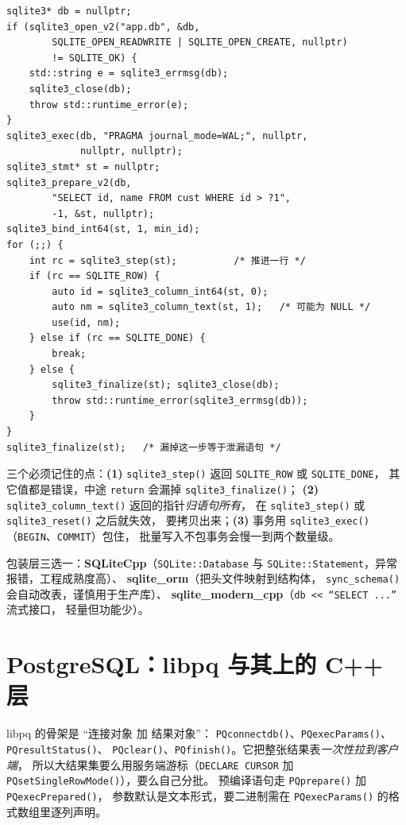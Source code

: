 \documentclass[12pt,a4paper,fontset=fandol]{ctexbook}
\newcommand{\Fn}[1]{\texttt{#1()}}
\newcommand{\Tp}[1]{\texttt{#1}}
\begin{document}
\begin{lstlisting}[caption={SQLite C API：prepare、bind、step、finalize}]
sqlite3* db = nullptr;
if (sqlite3_open_v2("app.db", &db,
        SQLITE_OPEN_READWRITE | SQLITE_OPEN_CREATE, nullptr)
        != SQLITE_OK) {
    std::string e = sqlite3_errmsg(db);
    sqlite3_close(db);
    throw std::runtime_error(e);
}
sqlite3_exec(db, "PRAGMA journal_mode=WAL;", nullptr,
             nullptr, nullptr);
sqlite3_stmt* st = nullptr;
sqlite3_prepare_v2(db,
        "SELECT id, name FROM cust WHERE id > ?1",
        -1, &st, nullptr);
sqlite3_bind_int64(st, 1, min_id);
for (;;) {
    int rc = sqlite3_step(st);          /* 推进一行 */
    if (rc == SQLITE_ROW) {
        auto id = sqlite3_column_int64(st, 0);
        auto nm = sqlite3_column_text(st, 1);   /* 可能为 NULL */
        use(id, nm);
    } else if (rc == SQLITE_DONE) {
        break;
    } else {
        sqlite3_finalize(st); sqlite3_close(db);
        throw std::runtime_error(sqlite3_errmsg(db));
    }
}
sqlite3_finalize(st);   /* 漏掉这一步等于泄漏语句 */
\end{lstlisting}

三个必须记住的点：\textbf{(1)} \Fn{sqlite3\_step} 返回
\Tp{SQLITE\_ROW} 或 \Tp{SQLITE\_DONE}，
其它值都是错误，中途 \Tp{return} 会漏掉 \Fn{sqlite3\_finalize}；
\textbf{(2)} \Fn{sqlite3\_column\_text} 返回的指针\emph{归语句所有}，
在 \Fn{sqlite3\_step} 或 \Fn{sqlite3\_reset} 之后就失效，
要拷贝出来；\textbf{(3)} 事务用
\Fn{sqlite3\_exec}（\texttt{BEGIN}、\texttt{COMMIT}）包住，
批量写入不包事务会慢一到两个数量级。

包装层三选一：\textbf{SQLiteCpp}（\Tp{SQLite::Database} 与
\Tp{SQLite::Statement}，异常报错，工程成熟度高）、
\textbf{sqlite\_orm}（把头文件映射到结构体，
\Fn{sync\_schema} 会自动改表，谨慎用于生产库）、
\textbf{sqlite\_modern\_cpp}（\texttt{db << ``SELECT ...''} 流式接口，
轻量但功能少）。

\section{PostgreSQL：libpq 与其上的 C++ 层}

libpq 的骨架是 ``连接对象 加 结果对象''：
\Fn{PQconnectdb}、\Fn{PQexec\allowbreak{}Params}、\Fn{PQresult\allowbreak{}Status}、
\Fn{PQclear}、\Fn{PQfinish}。它把整张结果表\emph{一次性拉到客户端}，
所以大结果集要么用服务端游标（\texttt{DECLARE CURSOR} 加
\Fn{PQset\allowbreak{}Single\allowbreak{}Row\allowbreak{}Mode}），要么自己分批。
预编译语句走 \Fn{PQprepare} 加 \Fn{PQexec\allowbreak{}Prepared}，
参数默认是文本形式，要二进制需在
\Fn{PQexec\allowbreak{}Params} 的格式数组里逐列声明。
\end{document}
